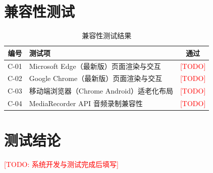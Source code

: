 \section{兼容性测试}

\begin{table}[H]
\centering
\caption{兼容性测试结果}
\label{tab:test-compat}
\begin{tabularx}{\textwidth}{|c|X|c|}
\hline
\textbf{编号} & \textbf{测试项} & \textbf{通过} \\
\hline
C-01 & Microsoft Edge（最新版）页面渲染与交互 & \textcolor{red}{[TODO]} \\
\hline
C-02 & Google Chrome（最新版）页面渲染与交互 & \textcolor{red}{[TODO]} \\
\hline
C-03 & 移动端浏览器（Chrome Android）适老化布局 & \textcolor{red}{[TODO]} \\
\hline
C-04 & MediaRecorder API 音频录制兼容性 & \textcolor{red}{[TODO]} \\
\hline
\end{tabularx}
\end{table}

\section{测试结论}

\textcolor{red}{[TODO: 系统开发与测试完成后填写]}

